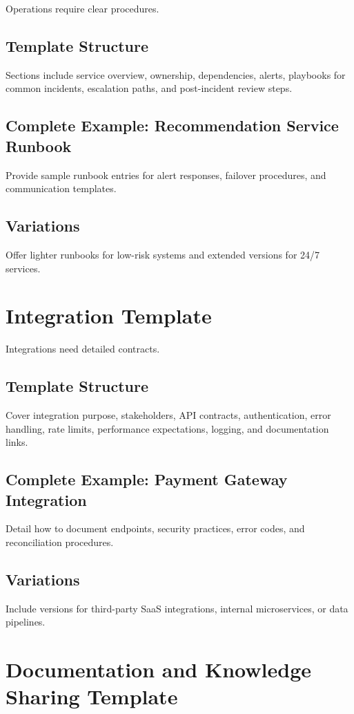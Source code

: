 Operations require clear procedures.

\subsection{Template Structure}
Sections include service overview, ownership, dependencies, alerts, playbooks for common incidents, escalation paths, and post-incident review steps.

\subsection{Complete Example: Recommendation Service Runbook}
Provide sample runbook entries for alert responses, failover procedures, and communication templates.

\subsection{Variations}
Offer lighter runbooks for low-risk systems and extended versions for 24/7 services.

\section{Integration Template}
\label{sec:integration-template}

Integrations need detailed contracts.

\subsection{Template Structure}
Cover integration purpose, stakeholders, API contracts, authentication, error handling, rate limits, performance expectations, logging, and documentation links.

\subsection{Complete Example: Payment Gateway Integration}
Detail how to document endpoints, security practices, error codes, and reconciliation procedures.

\subsection{Variations}
Include versions for third-party SaaS integrations, internal microservices, or data pipelines.

\section{Documentation and Knowledge Sharing Template}
\label{sec:documentation-template}

